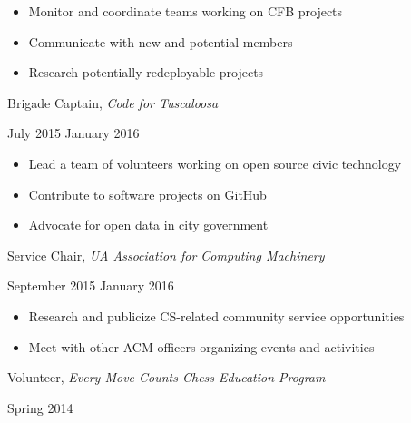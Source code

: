 \documentclass[11pt]{article}
\begin{document}
\begin{itemize}
  \item Monitor and coordinate teams working on CFB projects
  \item Communicate with new and potential members
  \item Research potentially redeployable projects
\end{itemize}

\begin{minipage}[t]{0.65\textwidth}
\flushleft
Brigade Captain, \textit{Code for Tuscaloosa}\\
\end{minipage}
\begin{minipage}[t]{0.30\textwidth}
\flushright
July 2015 \space \textemdash \space January 2016\\
\end{minipage}

\begin{itemize}
  \item Lead a team of volunteers working on open source civic technology
  \item Contribute to software projects on GitHub
  \item Advocate for open data in city government
\end{itemize}

\vspace{0.4em}
\begin{minipage}[t]{0.65\textwidth}
\flushleft
Service Chair, \textit{UA Association for Computing Machinery}\\
\end{minipage}
\begin{minipage}[t]{0.3\textwidth}
\flushright
September 2015 \space \textemdash \space January 2016\\
\end{minipage}

\begin{itemize}
  \item Research and publicize CS-related community service opportunities
  \item Meet with other ACM officers organizing events and activities
\end{itemize}

\vspace{0.4em}
\begin{minipage}[t]{0.65\textwidth}
\flushleft
Volunteer, \textit{Every Move Counts Chess Education Program}\\
\end{minipage}
\begin{minipage}[t]{0.30\textwidth}
\flushright
Spring 2014\\
\end{minipage}
\end{document}
